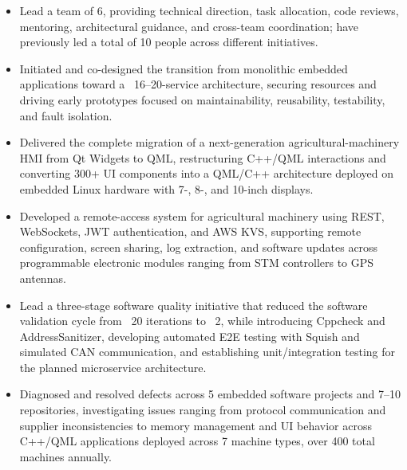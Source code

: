 
\begin{itemize}
  \item Lead a team of 6, providing technical direction, task allocation, code reviews, mentoring, architectural guidance, and cross-team coordination; have previously led a total of 10 people across different initiatives.
  \item Initiated and co-designed the transition from monolithic embedded applications toward a ~16–20-service architecture, securing resources and driving early prototypes focused on maintainability, reusability, testability, and fault isolation.
  \item Delivered the complete migration of a next-generation agricultural-machinery HMI from Qt Widgets to QML, restructuring C++/QML interactions and converting 300+ UI components into a QML/C++ architecture deployed on embedded Linux hardware with 7-, 8-, and 10-inch displays.
  \item Developed a remote-access system for agricultural machinery using REST, WebSockets, JWT authentication, and AWS KVS, supporting remote configuration, screen sharing, log extraction, and software updates across programmable electronic modules ranging from STM controllers to GPS antennas.
  \item Lead a three-stage software quality initiative that reduced the software validation cycle from ~20 iterations to ~2, while introducing Cppcheck and AddressSanitizer, developing automated E2E testing with Squish and simulated CAN communication, and establishing unit/integration testing for the planned microservice architecture.
  \item Diagnosed and resolved defects across 5 embedded software projects and 7–10 repositories, investigating issues ranging from protocol communication and supplier inconsistencies to memory management and UI behavior across C++/QML applications deployed across 7 machine types, over 400 total machines annually.
\end{itemize}



